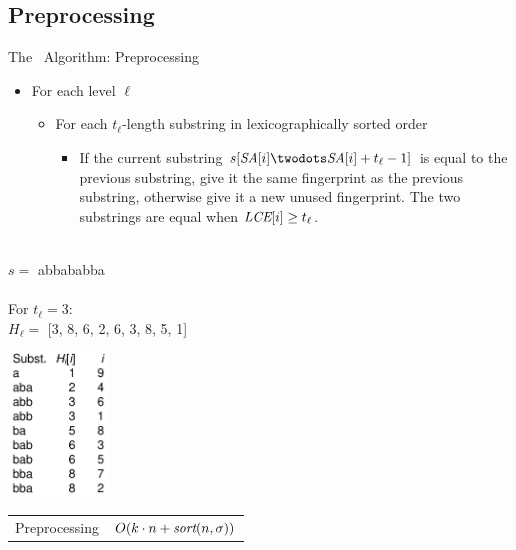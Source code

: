 \documentclass{beamer}
\begin{document}
\subsection{Preprocessing}
\begin{frame}{The \fprintk\ Algorithm: Preprocessing}
    \begin{itemize}
        \item For each level $\ell$
        \begin{itemize}
            \item For each $t_\ell$-length substring in lexicographically sorted order
            \begin{itemize}
                \item If the current substring $s[\SA[i]\twodots\SA[i]+t_\ell-1]$ is equal to the previous substring, give it the same fingerprint as the previous substring, otherwise give it a new unused fingerprint. The two substrings are equal when $\textit{LCE}[i] \geq t_\ell$.
            \end{itemize}
        \end{itemize}
    \end{itemize}

    \begin{multicols}{2}{
        \begin{center}
        \hfill\\
            $s=$ abbababba\\\hfill\\
            For $t_\ell = 3$:\\
            $H_\ell =$ [3, 8, 6, 2, 6, 3, 8, 5, 1]
        \end{center}
        \newpage
        \begin{center}
            \includegraphics[width=0.2\textwidth,page=1]{../doc/fingerprint-preproc.pdf}
        \end{center}
    }
    \end{multicols}

    \begin{tabular}{r l}
        Preprocessing & $O(k\cdot n + \textit{sort}(n,\sigma))$ \\
    \end{tabular}

\end{frame}
\end{document}
